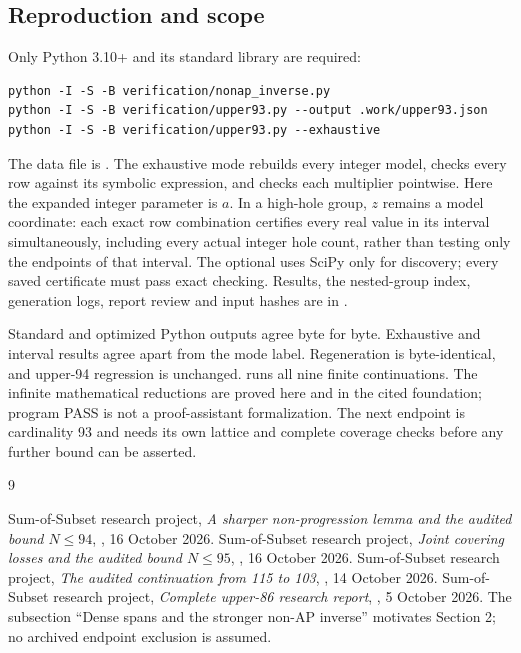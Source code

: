 \documentclass[11pt,a4paper]{article}
\begin{document}
\subsection*{Reproduction and scope}
Only Python 3.10+ and its standard library are required:
\begin{verbatim}
python -I -S -B verification/nonap_inverse.py
python -I -S -B verification/upper93.py --output .work/upper93.json
python -I -S -B verification/upper93.py --exhaustive
\end{verbatim}
The data file is .
The exhaustive mode rebuilds every integer model, checks every row
against its symbolic expression, and checks each multiplier pointwise.
Here the expanded integer parameter is $a$. In a high-hole group, $z$
remains a model coordinate: each exact row combination certifies every
real value in its interval simultaneously, including every actual integer
hole count, rather than testing only the endpoints of that interval.
The optional  uses
SciPy only for discovery; every saved certificate must pass exact checking.
Results, the nested-group index, generation logs, report review and input
hashes are in .

Standard and optimized Python outputs agree byte for byte. Exhaustive
and interval results agree apart from the mode label. Regeneration is
byte-identical, and upper-94 regression is unchanged.
 runs all nine finite continuations.
The infinite mathematical reductions are proved here and in the cited
foundation; program PASS is not a proof-assistant formalization.
The next endpoint is cardinality 93 and needs its own lattice and
complete coverage checks before any further bound can be asserted.

\begin{thebibliography}{9}\raggedright
{} Sum-of-Subset research project,
\emph{A sharper non-progression lemma and the audited bound $N\le94$},
, 16 October 2026.
 Sum-of-Subset research project,
\emph{Joint covering losses and the audited bound $N\le95$},
, 16 October 2026.
 Sum-of-Subset research project,
\emph{The audited continuation from 115 to 103},
, 14 October 2026.
 Sum-of-Subset research project,
\emph{Complete upper-86 research report},
, 5 October 2026.
The subsection ``Dense spans and the stronger non-AP inverse'' motivates
Section 2; no archived endpoint exclusion is assumed.
\end{thebibliography}
\end{document}

